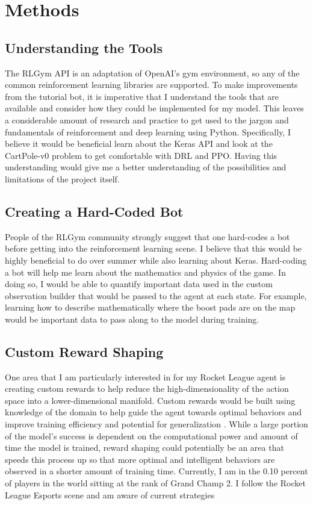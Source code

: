 \documentclass[10pt,twocolumn]{article}
\begin{document}
\section{Methods}

\subsection{Understanding the Tools}
The RLGym API is an adaptation of OpenAI's gym environment, so any of the common reinforcement learning libraries are supported. To make improvements from the tutorial bot, it is imperative that I understand the tools that are available and consider how they could be implemented for my model. This leaves a considerable amount of research and practice to get used to the jargon and fundamentals of reinforcement and deep learning using Python. Specifically, I believe it would be beneficial learn about the Keras API and look at the CartPole-v0 problem to get comfortable with DRL and PPO. Having this understanding would give me a better understanding of the possibilities and limitations of the project itself.

\subsection{Creating a Hard-Coded Bot}
People of the RLGym community strongly suggest that one hard-codes a bot before getting into the reinforcement learning scene. I believe that this would be highly beneficial to do over summer while also learning about Keras. Hard-coding a bot will help me learn about the mathematics and physics of the game. In doing so, I would be able to quantify important data used in the custom observation builder that would be passed to the agent at each state. For example, learning how to describe mathematically where the boost pads are on the map would be important data to pass along to the model during training. 

\subsection{Custom Reward Shaping}

One area that I am particularly interested in for my Rocket League agent is creating custom rewards to help reduce the high-dimensionality of the action space into a lower-dimensional manifold. Custom rewards would be built using knowledge of the domain to help guide the agent towards optimal behaviors and improve training efficiency and potential for generalization \cite{DBLP:journals/corr/abs-1908-06884}. While a large portion of the model's success is dependent on the computational power and amount of time the model is trained, reward shaping could potentially be an area that speeds this process up so that more optimal and intelligent behaviors are observed in a shorter amount of training time. Currently, I am in the 0.10 percent of players in the world sitting at the rank of Grand Champ 2. I follow the Rocket League Esports scene and am aware of current strategies  
\end{document}
